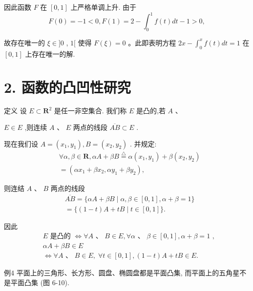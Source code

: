 因此函数 $F$ 在 $\left\lbrack  {0,1}\right\rbrack$ 上严格单调上升. 由于
$$F\left( 0\right)  =  - 1 < 0,F\left( 1\right)  = 2 - {\int }_{0}^{1}f\left( t\right) {dt} - 1 > 0,$$

故存在唯一的 $\xi  \in  \rbrack 0$ , $1\lbrack$ 使得 $F\left( \xi \right)  = 0$ 。此即表明方程 ${2x} - {\int }_{0}^{x}f\left( t\right) {dt} = 1$ 在 $\left\lbrack  {0,1}\right\rbrack$ 上存在唯一的解.

\section*{2. 函数的凸凹性研究}

定义 设 $E \subset  {\mathbf{R}}^{2}$ 是任一非空集合. 我们称 $E$ 是凸的,若 $A$ 、

$E \in  E$ ,则连续 $A\text{ 、 }E$ 两点的线段 $\overline{AB} \subset  E$ .

现在我们设 $A = \left( {{x}_{1},{y}_{1}}\right) ,B = \left( {{x}_{2},{y}_{2}}\right)$ . 并规定:
\begin{align*}
	&\forall \alpha ,\beta  \in  \mathbf{R},{\alpha A} + {\beta B}\overset{ \bigtriangleup  }{ = }\alpha \left( {{x}_{1},{y}_{1}}\right)  + \beta \left( {{x}_{2},{y}_{2}}\right)\\
	&= \left( {\alpha {x}_{1} + \beta {x}_{2},\alpha {y}_{1} + \beta {y}_{2}}\right) ,
\end{align*}

则连结 $A$ 、 $B$ 两点的线段
\begin{align*}
	&\overline{AB} = \{ {\alpha A} + {\beta B} \mid  \alpha ,\beta  \in  \left\lbrack  {0,1}\right\rbrack  ,\alpha  + \beta  = 1\}\\
	&= \{ \left( {1 - t}\right) A + {tB} \mid  t \in  \left\lbrack  {0,1}\right\rbrack  \} .
\end{align*}

因此
\begin{align*}
	&E\text{ 是凸的 } \Leftrightarrow  \forall A\text{ 、 }B \in  E,\forall \alpha \text{ 、 }\beta  \in  \left\lbrack  {0,1}\right\rbrack  ,\alpha  + \beta  = 1\text{ , }\\
	&{\alpha A} + {\beta B} \in  E\\
	&\Leftrightarrow  \forall A\text{ 、 }B \in  E,\;\forall t \in  \left\lbrack  {0,1}\right\rbrack  ,\left( {1 - t}\right) A + {tB} \in  E.
\end{align*}

例4 平面上的三角形、长方形、圆盘、椭圆盘都是平面凸集, 而平面上的五角星不是平面凸集 (图 6-10).

